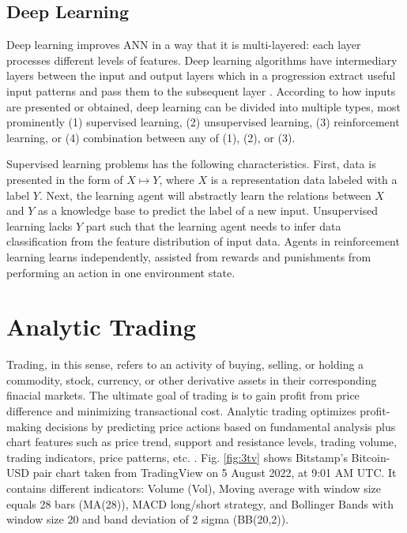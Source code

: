 
\subsection{Deep Learning}
Deep learning improves ANN in a way that it is multi-layered: each layer processes different levels of features. Deep learning algorithms have intermediary layers between the input and output layers which in a progression extract useful input patterns and pass them to the subsequent layer \cite{NN03}. According to how inputs are presented or obtained, deep learning can be divided into multiple types, most prominently (1) supervised learning, (2) unsupervised learning, (3) reinforcement learning, or (4) combination between any of (1), (2), or (3).

Supervised learning problems has the following characteristics. First, data is presented in the form of $X \mapsto Y$, where $X$ is a representation data labeled with a label $Y$. Next, the learning agent will abstractly learn the relations between $X$ and $Y$ as a knowledge base to predict the label of a new input. Unsupervised learning lacks $Y$ part such that the learning agent needs to infer data classification from the feature distribution of input data. Agents in reinforcement learning learns independently, assisted from rewards and punishments from performing an action in one environment state.

\section{Analytic Trading}
\indent\indent Trading, in this sense, refers to an activity of buying, selling, or holding a commodity, stock, currency, or other derivative assets in their corresponding finacial markets. The ultimate goal of trading is to gain profit from price difference and minimizing transactional cost. Analytic trading optimizes profit-making decisions by predicting price actions based on fundamental analysis plus chart features such as price trend, support and resistance levels, trading volume, trading indicators, price patterns, etc. \cite{AT52}. Fig. \ref{fig:3tv} shows Bitstamp's Bitcoin-USD pair chart taken from TradingView on 5 August 2022, at 9:01 AM UTC. It contains different indicators: Volume (Vol), Moving average with window size equals 28 bars (MA(28)), MACD long/short strategy, and Bollinger Bands with window size 20 and band deviation of 2 sigma (BB(20,2)).

